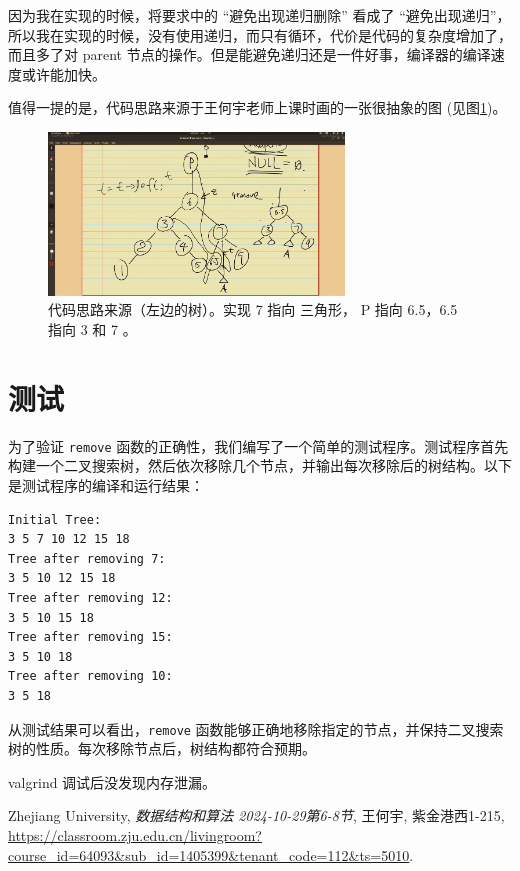 \documentclass[UTF8]{ctexart}
\begin{document}
因为我在实现的时候，将要求中的 “避免出现递归删除” 看成了 “避免出现递归”，所以我在实现的时候，没有使用递归，而只有循环，代价是代码的复杂度增加了，而且多了对 parent 节点的操作。但是能避免递归还是一件好事，编译器的编译速度或许能加快。

值得一提的是，代码思路来源于王何宇老师上课时画的一张很抽象的图 (见图\ref{fig:inspiration})\cite{DS_1029_course}。
\begin{figure}
    \centering
    \includegraphics[width=0.7\textwidth]{./img/inspiration.png}
    \caption{代码思路来源（左边的树）。实现 7 指向 三角形， P 指向 6.5，6.5 指向 3 和 7 。}
    \label{fig:inspiration}
\end{figure}

\section{测试}

为了验证 \texttt{remove} 函数的正确性，我们编写了一个简单的测试程序。测试程序首先构建一个二叉搜索树，然后依次移除几个节点，并输出每次移除后的树结构。以下是测试程序的编译和运行结果：

\begin{verbatim}
Initial Tree:
3 5 7 10 12 15 18
Tree after removing 7:
3 5 10 12 15 18
Tree after removing 12:
3 5 10 15 18
Tree after removing 15:
3 5 10 18
Tree after removing 10:
3 5 18
\end{verbatim}

从测试结果可以看出，\texttt{remove} 函数能够正确地移除指定的节点，并保持二叉搜索树的性质。每次移除节点后，树结构都符合预期。

valgrind 调试后没发现内存泄漏。

\begin{thebibliography}{9}

Zhejiang University, 
\textit{数据结构和算法 2024-10-29第6-8节}, 
王何宇, 紫金港西1-215, 
\url{https://classroom.zju.edu.cn/livingroom?course_id=64093&sub_id=1405399&tenant_code=112&ts=5010}.

\end{thebibliography}
\end{document}
